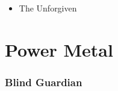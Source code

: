 \begin{minipage}[t]{0.25\textwidth}\vspace{0pt}
\begin{itemize}[nosep,leftmargin=1em,labelwidth=*,align=left]
	\setlength{\itemsep}{0pt}
	\item The Unforgiven
\end{itemize}
\end{minipage}


\section{Power Metal}

\subsubsection{Blind Guardian}

